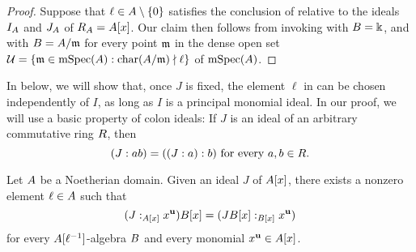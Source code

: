 \documentclass{amsart}
\begin{document}
 \begin{proof}
    Suppose that $\ell \in A \setminus \{0\}$ satisfies the conclusion of  relative to the ideals $I_A$ and $J_A$ of $R_A=A[x]$.  Our claim then follows from invoking  with $B=\Bbbk$, and with $B=A/\mathfrak{m}$ for every point $\mathfrak{m}$ in the dense open set $\mathcal{U} = \{\mathfrak{m} \in \operatorname{mSpec}(A) : \operatorname{char}(A/\mathfrak{m}) \nmid \ell\}$ of $\operatorname{mSpec}(A)$. 
\end{proof}

In  {below, we will show that, once $J$ is fixed, the element} $\ell$ in  can be chosen independently of $I$, {as long as $I$ is a principal monomial ideal.   In our proof, we will use a basic property of colon ideals:  If $J$ is an ideal of an arbitrary commutative ring $R$, then}
\begin{equation}
\label{iterated colon: e}
 (J: ab) = ((J: a): b) \text{ for every } a,b \in R.
\end{equation}

\begin{corollary}
   \label{all monomial colons: C} 
   Let $A$ be a Noetherian domain.
   Given an ideal $J$ of $A[x]$, there exists a nonzero element $\ell \in A$ such that
   \[ (J:_{A[x]} x^{\mathbf{u}}) B[x] = (J B[x]:_{B[x]} x^{\mathbf{u}})\]
   for every $A[\ell^{-1}]$-algebra $B$ and every monomial $x^{\mathbf{u}} \in A[x]$.   
\end{corollary}
\end{document}
